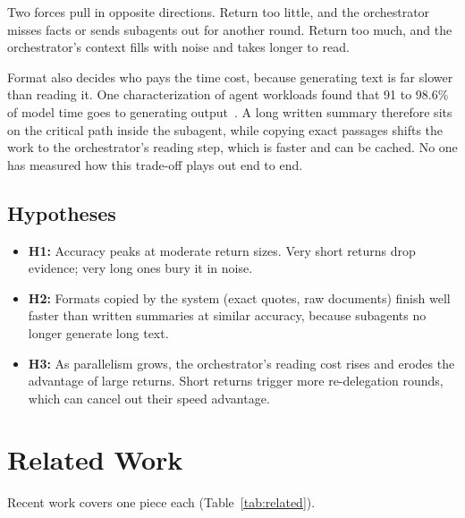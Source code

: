 \documentclass[11pt]{article}
\begin{document}
Two forces pull in opposite directions. Return too little, and the orchestrator misses facts or sends subagents out for another round. Return too much, and the orchestrator's context fills with noise and takes longer to read.

Format also decides who pays the time cost, because generating text is far slower than reading it. One characterization of agent workloads found that 91 to 98.6\% of model time goes to generating output~\citep{yuan2026agentic}. A long written summary therefore sits on the critical path inside the subagent, while copying exact passages shifts the work to the orchestrator's reading step, which is faster and can be cached. No one has measured how this trade-off plays out end to end.

\subsection{Hypotheses}
\begin{itemize}
  \item \textbf{H1:} Accuracy peaks at moderate return sizes. Very short returns drop evidence; very long ones bury it in noise.
  \item \textbf{H2:} Formats copied by the system (exact quotes, raw documents) finish well faster than written summaries at similar accuracy, because subagents no longer generate long text.
  \item \textbf{H3:} As parallelism grows, the orchestrator's reading cost rises and erodes the advantage of large returns. Short returns trigger more re-delegation rounds, which can cancel out their speed advantage.
\end{itemize}

\section{Related Work}
Recent work covers one piece each (Table~\ref{tab:related}).
\end{document}
